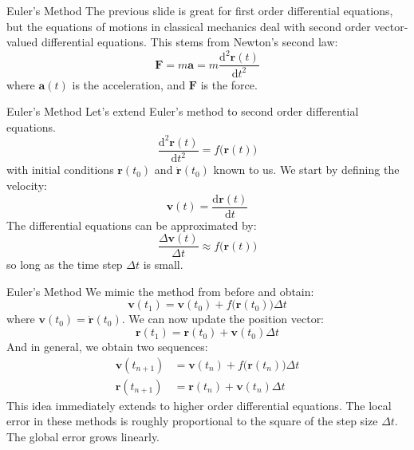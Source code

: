 \documentclass{beamer}
\begin{document}
    \begin{frame}{Euler's Method}
        The previous slide is great for first order differential equations,
        but the equations of motions in classical mechanics deal with
        second order vector-valued differential equations. This stems from
        Newton's second law:
        \begin{equation}
            \mathbf{F}=m\mathbf{a}
                =m\frac{\textrm{d}^{2}\mathbf{r}(t)}{\textrm{d}t^{2}}
        \end{equation}
        where $\mathbf{a}(t)$ is the acceleration, and $\mathbf{F}$ is the
        force.
    \end{frame}
    \begin{frame}{Euler's Method}
        Let's extend Euler's method to second order differential equations.
        \begin{equation}
            \frac{\textrm{d}^{2}\mathbf{r}(t)}{\textrm{d}t^{2}}
                =f\big(\mathbf{r}(t)\big)
        \end{equation}
        with initial conditions $\mathbf{r}(t_{0})$ and
        $\dot{\mathbf{r}}(t_{0})$ known to us.
        We start by defining the velocity:
        \begin{equation}
            \mathbf{v}(t)=\frac{\textrm{d}\mathbf{r}(t)}{\textrm{d}t}
        \end{equation}
        The differential equations can be approximated by:
        \begin{equation}
            \frac{\Delta\mathbf{v}(t)}{\Delta{t}}
            \approx{f}\big(\mathbf{r}(t)\big)
        \end{equation}
        so long as the time step $\Delta{t}$ is small.
    \end{frame}
    \begin{frame}{Euler's Method}
        We mimic the method from before and obtain:
        \begin{equation}
            \mathbf{v}(t_{1})=\mathbf{v}(t_{0})
                +f\big(\mathbf{r}(t_{0})\big)\Delta{t}
        \end{equation}
        where $\mathbf{v}(t_{0})=\dot{\mathbf{r}}(t_{0})$. We can now update
        the position vector:
        \begin{equation}
            \mathbf{r}(t_{1})
                =\mathbf{r}(t_{0})+\mathbf{v}(t_{0})\Delta{t}
        \end{equation}
        And in general, we obtain two sequences:
        \begin{align}
            \mathbf{v}(t_{n+1})&=\mathbf{v}(t_{n})
                +f\big(\mathbf{r}(t_{n})\big)\Delta{t}\\
            \mathbf{r}(t_{n+1})
                &=\mathbf{r}(t_{n})+\mathbf{v}(t_{n})\Delta{t}
        \end{align}
        This idea immediately extends to higher order differential equations.
        The local error in these methods is roughly proportional to the square
        of the step size $\Delta{t}$. The global error grows linearly.
    \end{frame}
\end{document}

